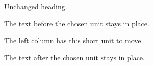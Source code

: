 \documentclass[11pt,twocolumn]{article}
\begin{document}
Unchanged heading.

The text before the chosen unit stays in place.

The left column has this short unit to move.


\par\vspace{25mm}
The text after the chosen unit stays in place.
\end{document}
